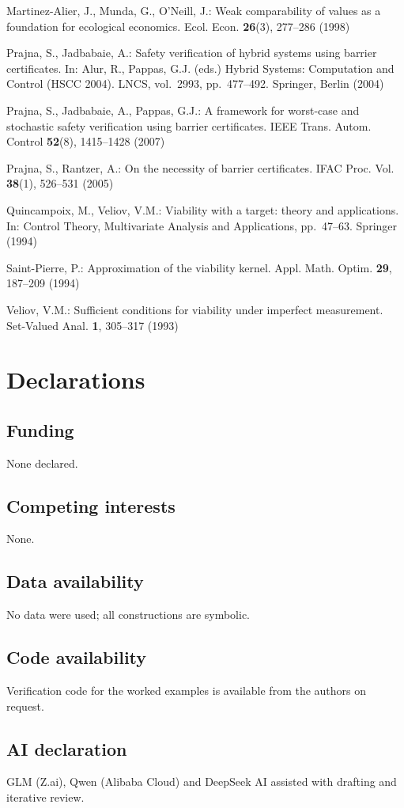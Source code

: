 \documentclass[11pt]{article}
\begin{document}
Martinez-Alier, J., Munda, G., O'Neill, J.: Weak comparability of values
as a foundation for ecological economics. Ecol. Econ. \textbf{26}(3),
277--286 (1998)

Prajna, S., Jadbabaie, A.: Safety verification of hybrid systems using
barrier certificates. In: Alur, R., Pappas, G.J. (eds.) Hybrid Systems:
Computation and Control (HSCC 2004). LNCS, vol.~2993, pp.~477--492.
Springer, Berlin (2004)

Prajna, S., Jadbabaie, A., Pappas, G.J.: A framework for worst-case and
stochastic safety verification using barrier certificates. IEEE Trans.
Autom. Control \textbf{52}(8), 1415--1428 (2007)

Prajna, S., Rantzer, A.: On the necessity of barrier certificates. IFAC
Proc. Vol. \textbf{38}(1), 526--531 (2005)

Quincampoix, M., Veliov, V.M.: Viability with a target: theory and
applications. In: Control Theory, Multivariate Analysis and
Applications, pp.~47--63. Springer (1994)

Saint-Pierre, P.: Approximation of the viability kernel. Appl. Math.
Optim. \textbf{29}, 187--209 (1994)

Veliov, V.M.: Sufficient conditions for viability under imperfect
measurement. Set-Valued Anal. \textbf{1}, 305--317 (1993)

\section*{Declarations}

\subsection*{Funding}

None declared.

\subsection*{Competing interests}

None.

\subsection*{Data availability}

No data were used; all constructions are symbolic.

\subsection*{Code availability}

Verification code for the worked examples is available from the authors on request.

\subsection*{AI declaration}
GLM (Z.ai), Qwen (Alibaba Cloud) and DeepSeek AI assisted with drafting and iterative review.
\end{document}
